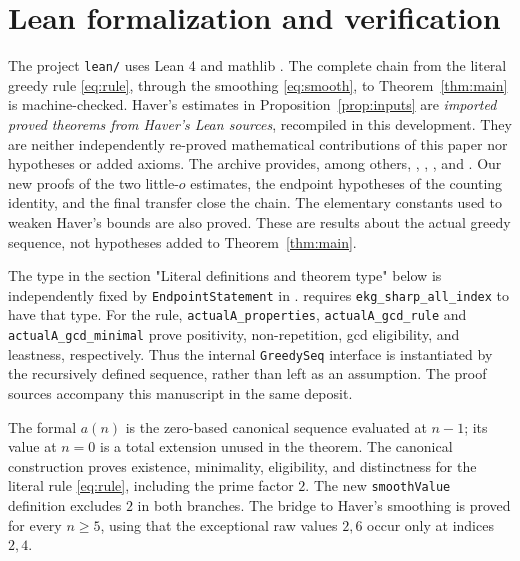 \section{Lean formalization and verification}\label{sec:lean-notes}

The project \texttt{lean/} uses Lean 4 \cite{lean} and mathlib
\cite{mathlib}. The complete chain from the literal greedy rule
\eqref{eq:rule}, through the smoothing \eqref{eq:smooth}, to
Theorem~\ref{thm:main} is machine-checked. Haver's estimates in
Proposition~\ref{prop:inputs} are \emph{imported proved theorems from Haver's
Lean sources}, recompiled in this development. They are neither
independently re-proved mathematical contributions of this paper nor
hypotheses or added axioms. The archive provides, among others,
, ,
,  and
. Our new proofs of the two little-$o$
estimates, the endpoint hypotheses of the counting identity, and the final
transfer close the chain.
The elementary constants used to weaken Haver's bounds are also proved.
These are results about the actual greedy sequence, not hypotheses
added to Theorem~\ref{thm:main}.

The type in the section "Literal definitions and theorem type" below is independently fixed by
\texttt{EndpointStatement} in .
 requires \texttt{ekg\_sharp\_all\_index} to have that type.
For the rule, \texttt{actualA\_properties}, \texttt{actualA\_gcd\_rule}
and \texttt{actualA\_gcd\_minimal} prove positivity, non-repetition,
gcd eligibility, and leastness, respectively. Thus the internal
\texttt{GreedySeq} interface is instantiated by the recursively defined
sequence, rather than left as an assumption.
The proof sources accompany this manuscript in the same deposit.

The formal $a(n)$ is the zero-based canonical sequence evaluated at
$n-1$; its value at $n=0$ is a total extension unused in the theorem.
The canonical construction proves existence, minimality, eligibility,
and distinctness for the literal rule \eqref{eq:rule}, including the
prime factor $2$. The new \texttt{smoothValue} definition excludes
$2$ in both branches. The bridge to Haver's smoothing is proved
for every $n\geq5$, using that the exceptional raw values $2,6$
occur only at indices $2,4$.

